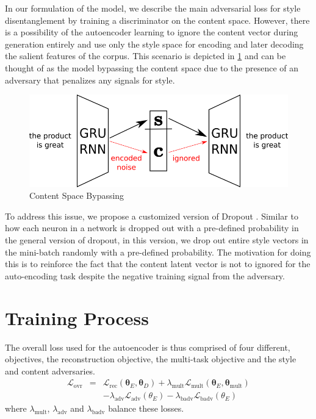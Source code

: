 In our formulation of the model, we describe the main adversarial loss for style disentanglement by training a discriminator on the content space. However, there is a possibility of the autoencoder learning to ignore the content vector during generation entirely and use only the style space for encoding and later decoding the salient features of the corpus. This scenario is depicted in \ref{fig:model-content-bypass} and can be thought of as the model bypassing the content space due to the presence of an adversary that penalizes any signals for style.

\begin{figure}[ht]
	\centering
	\includegraphics[width=\linewidth]{images/model-content-bypass}
	\caption{Content Space Bypassing}
	\label{fig:model-content-bypass}
\end{figure}

To address this issue, we propose a customized version of Dropout \cite{srivastava2014dropout}. Similar to how each neuron in a network is dropped out with a pre-defined probability in the general version of dropout, in this version, we drop out entire style vectors in the mini-batch randomly with a pre-defined probability. The motivation for doing this is to reinforce the fact that the content latent vector is not to ignored for the auto-encoding task despite the negative training signal from the adversary.


\section{Training Process}

The overall loss used for the autoencoder is thus comprised of four different, objectives, the reconstruction objective, the multi-task objective and the style and content adversaries.
\begin{eqnarray*}
	\mathcal{L}_\text{ovr} &=&
	\mathcal{L}_\text{rec}(\bm\theta_E, \bm\theta_D)
	+ \lambda_\text{mult} \mathcal{L}_\text{mult} (\bm\theta_E,\bm\theta_\text{mult}) \\ & &
	- \lambda_\text{adv} \mathcal{L}_\text{adv}(\theta_E)
	- \lambda_\text{badv} \mathcal{L}_\text{badv}(\theta_E)
\end{eqnarray*}
where $\lambda_\text{mult}$, $\lambda_\text{adv}$ and $\lambda_\text{badv}$ balance these losses.

